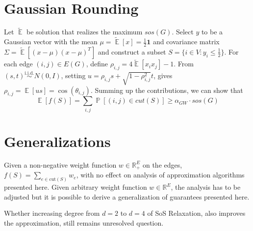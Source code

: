 \documentclass[twoside,leqno,twocolumn]{article}
\newcommand{\vect}[1]{\boldsymbol{#1}}
\DeclareMathOperator{\Ex}{\mathbb{E}}
\DeclareMathOperator{\Prob}{\mathbb{P}}
\begin{document}
\section{Gaussian Rounding} Let $\tilde{\Ex}$ be solution that realizes the maximum $sos(G)$. Select $y$ to be a Gaussian vector with the mean $\mu = \tilde{\Ex}[x] = \frac{1}{2} \vect{1}$ and covariance matrix $\Sigma = \tilde{\Ex}[(x - \mu)(x - \mu)^{T}]$ and construct a subset $S = \lbrace i \in V : y_{i} \leq \frac{1}{2} \rbrace$. For each edge $(i, j) \in E(G)$, define $\rho_{i, j} = 4 \tilde{\Ex}[x_{i} x_{j}] - 1$. From $(s, t) \overset{\text{i.i.d.}}{\sim} N(0, I)$, setting $u = \rho_{i, j} s + \sqrt{1 - \rho_{i, j}^{2}} t$, gives $\rho_{i, j} = \Ex[u s] = \cos(\theta_{i, j})$. Summing up the contributions, we can show that
\begin{equation*}
\Ex[f(S)] = \sum_{i, j}  \Prob[(i, j) \in cut(S)] \geq \alpha_{GW} \cdot 
sos(G)
\end{equation*}

\section{Generalizations}
Given a non-negative weight function $w \in \mathbb{R}^{E}_{+}$ on the edges, $f(S) = \sum_{e \in \text{cut}(S)} w_e$, with no effect on analysis of approximation algorithms presented here. Given arbitrary weight function $w \in \mathbb{R}^{E}$, the analysis has to be adjusted but it is possible to derive a generalization of guarantees presented here. 

Whether increasing degree from $d=2$ to $d=4$ of SoS Relaxation, also improves the approximation, still remains unresolved question.


%


\end{document}
